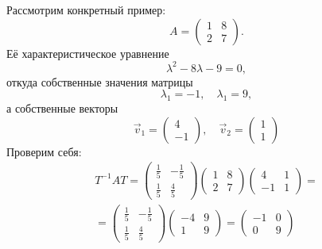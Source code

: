 Рассмотрим конкретный пример:
\begin{equation}
    A = \begin{pmatrix}
    1 & 8\\
    2 & 7
    \end{pmatrix}.
\end{equation}
Её характеристическое уравнение
\begin{equation}
    \lambda^2 - 8\lambda - 9 = 0,
\end{equation}
откуда собственные значения матрицы
\begin{equation}
    \lambda_1 = -1,\quad \lambda_1 = 9,
\end{equation}
а собственные векторы
\begin{equation}
    \vec{v}_1 = \begin{pmatrix}
    4 \\
    -1
    \end{pmatrix},\quad
    \vec{v}_2 = \begin{pmatrix}
    1 \\
    1
    \end{pmatrix}
\end{equation}
Проверим себя:
\begin{gather}
    T^{-1}AT =
    \begin{pmatrix}
        \frac{1}{5} & -\frac{1}{5} \\
        \frac{1}{5} & \frac{4}{5}
    \end{pmatrix}
    \begin{pmatrix}
        1 & 8\\
        2 & 7
    \end{pmatrix}
    \begin{pmatrix}
        4 & 1 \\
        -1 & 1
    \end{pmatrix} =\nonumber\\
    = \begin{pmatrix}
        \frac{1}{5} & -\frac{1}{5} \\
        \frac{1}{5} & \frac{4}{5}
    \end{pmatrix}
    \begin{pmatrix}
        -4 & 9\\
        1 & 9
    \end{pmatrix} =
    \begin{pmatrix}
        -1 & 0\\
        0 & 9
    \end{pmatrix}
\end{gather}
